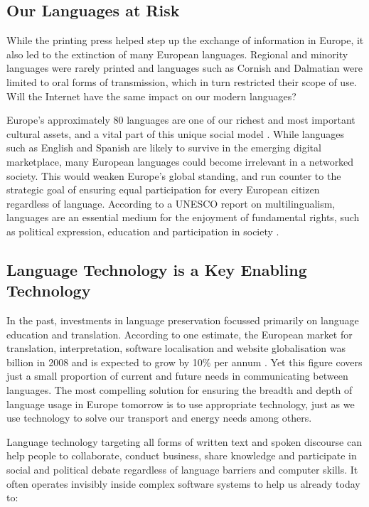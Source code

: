\begin{multicols}{2}
\subsection{Our Languages at Risk}

While the printing press helped step up the exchange of information in Europe, it also led to the extinction of many European languages. Regional and minority languages were rarely printed and languages such as Cornish and Dalmatian were limited to oral forms of transmission, which in turn restricted their scope of use. Will the Internet have the same impact on our modern languages?


Europe's approximately 80 languages are one of our richest and most important cultural assets, and a vital part of this unique social model \cite{EC2}. While languages such as English and Spanish are likely to survive in the emerging digital marketplace, many European languages could become irrelevant in a networked society. This would weaken Europe's global standing, and run counter to the strategic goal of ensuring equal participation for every European citizen regardless of language. According to a UNESCO report on multilingualism, languages are an essential medium for the enjoyment of fundamental rights, such as political expression, education and participation in society \cite{Unesco1}.

\subsection{Language Technology is a Key Enabling Technology}

In the past, investments in language preservation focussed primarily on language education and translation. According to one estimate, the European market for translation, interpretation, software localisation and website globalisation was  billion in 2008 and is expected to grow by 10\% per annum \cite{EC3}. Yet this figure covers just a small proportion of current and future needs in communicating between languages. The most compelling solution for ensuring the breadth and depth of language usage in Europe tomorrow is to use appropriate technology, just as we use technology to solve our transport and energy needs among others.

Language technology targeting all forms of written text and spoken discourse can help people to collaborate, conduct business, share knowledge and participate in social and political debate regardless of language barriers and computer skills. It often operates invisibly inside complex software systems to help us already today to:


\end{multicols}
